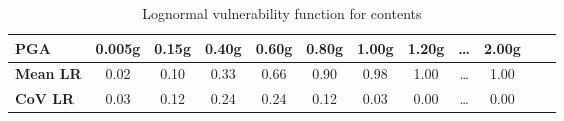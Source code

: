 \begin{table}[htbp]

\centering
\begin{tabular}{ l c c c c c c c c c c c}

\hline
\rowcolor{anti-flashwhite}
\bf{PGA} & \bf{0.005g} & \bf{0.15g} & \bf{0.40g} & \bf{0.60g} & \bf{0.80g} & \bf{1.00g} & \bf{1.20g} & \bf{\dots} & \bf{2.00g} \\
\hline
\bf{Mean LR} & 0.02 & 0.10 & 0.33 & 0.66 & 0.90 & 0.98 & 1.00 & \dots & 1.00 \\
\bf{CoV LR} & 0.03 & 0.12 & 0.24 & 0.24 & 0.12 & 0.03 & 0.00 & \dots & 0.00 \\
\hline
\end{tabular}

\caption{Lognormal vulnerability function for contents}
\label{tab:vf-ln-tax1-con}
\end{table}